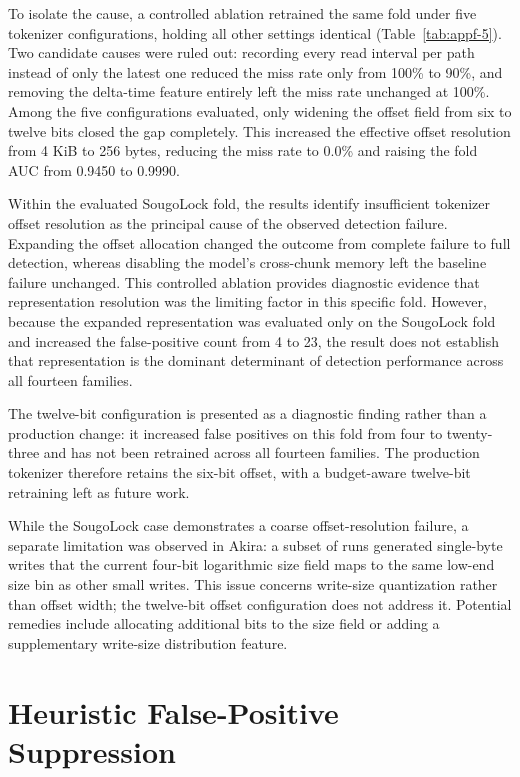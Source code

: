 To isolate the cause, a controlled ablation retrained the same fold under five tokenizer configurations, holding all other settings identical (Table~\ref{tab:appf-5}). Two candidate causes were ruled out: recording every read interval per path instead of only the latest one reduced the miss rate only from 100\% to 90\%, and removing the delta-time feature entirely left the miss rate unchanged at 100\%. Among the five configurations evaluated, only widening the offset field from six to twelve bits closed the gap completely. This increased the effective offset resolution from 4 KiB to 256 bytes, reducing the miss rate to 0.0\% and raising the fold AUC from 0.9450 to 0.9990.

Within the evaluated SougoLock fold, the results identify insufficient tokenizer offset resolution as the principal cause of the observed detection failure. Expanding the offset allocation changed the outcome from complete failure to full detection, whereas disabling the model's cross-chunk memory left the baseline failure unchanged. This controlled ablation provides diagnostic evidence that representation resolution was the limiting factor in this specific fold. However, because the expanded representation was evaluated only on the SougoLock fold and increased the false-positive count from 4 to 23, the result does not establish that representation is the dominant determinant of detection performance across all fourteen families.

The twelve-bit configuration is presented as a diagnostic finding rather than a production change: it increased false positives on this fold from four to twenty-three and has not been retrained across all fourteen families. The production tokenizer therefore retains the six-bit offset, with a budget-aware twelve-bit retraining left as future work.

While the SougoLock case demonstrates a coarse offset-resolution failure, a separate limitation was observed in Akira: a subset of runs generated single-byte writes that the current four-bit logarithmic size field maps to the same low-end size bin as other small writes. This issue concerns write-size quantization rather than offset width; the twelve-bit offset configuration does not address it. Potential remedies include allocating additional bits to the size field or adding a supplementary write-size distribution feature.

\section{Heuristic False-Positive Suppression}\label{sec:4.6}

